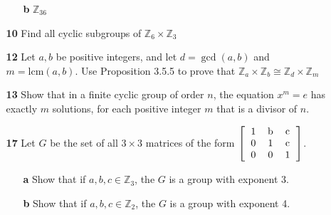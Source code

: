 \documentclass[paper=usletter, fontsize=12pt]{article}
\begin{document}
\begin{itemize}
\begin{itemize}
\begin{enumerate}
                \item[\textbf{b}] $\mathbb{Z}_{36}$
                \begin{cproof}
                \end{cproof}

            \end{enumerate}

            \item[\textbf{10}] Find all cyclic subgroups of $\mathbb{Z}_{6}
            \times \mathbb{Z}_{3}$
            \begin{cproof}
            \end{cproof}

            \item[\textbf{12}] Let $a,b$ be positive integers, and let
            $d=\gcd(a,b)$ and $m=\text{lcm}(a,b)$. Use Proposition 3.5.5 to
            prove that $\mathbb{Z}_{a}\times \mathbb{Z}_{b} \cong
            \mathbb{Z}_{d} \times \mathbb{Z}_{m}$
            \begin{cproof}
            \end{cproof}

            \item[\textbf{13}] Show that in a finite cyclic group of order $n$,
            the equation $x^m=e$ has exactly $m$ solutions, for each positive
            integer $m$ that is a divisor of $n$.
            \begin{cproof}
            \end{cproof}

            \item[\textbf{17}] Let $G$ be the set of all $3\times 3$ matrices of the form $\left[\begin{tabular}{ccc}
                    1 & b & c \\
                    0 & 1 & c \\
                    0 & 0 & 1
                \end{tabular}\right]$.

            \begin{itemize}

                \item[\textbf{a}] Show that if $a,b,c\in \mathbb{Z}_3$, the $G$
                is a group with exponent 3.
                \begin{cproof}
                \end{cproof}

                \item[\textbf{b}] Show that if $a,b,c\in \mathbb{Z}_2$, the $G$
                is a group with exponent 4.
                \begin{cproof}
                \end{cproof}


\end{itemize}
\end{itemize}
\end{itemize}
\end{document}
